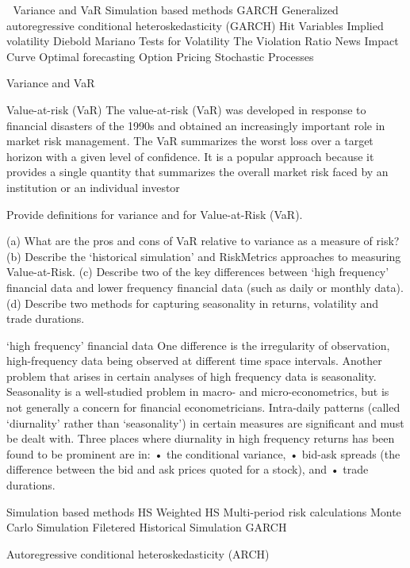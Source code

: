

Variance and VaR
Simulation based methods
GARCH
Generalized autoregressive conditional heteroskedasticity (GARCH)
Hit Variables
Implied volatility
Diebold Mariano Tests for Volatility
The Violation Ratio
News Impact Curve
Optimal forecasting
Option Pricing
Stochastic Processes



Variance and VaR

Value-at-risk (VaR)
The value-at-risk (VaR) was developed in response to ﬁnancial disasters of the 1990s and obtained an increasingly important role in market risk management.
The VaR summarizes the worst loss over a target horizon with a given level of conﬁdence. It is a popular approach because it provides a single quantity that summarizes the overall market risk faced by an institution or an individual investor

Provide deﬁnitions for variance and for Value-at-Risk (VaR).

(a) What are the pros and cons of VaR relative to variance as a measure of risk?
(b) Describe the ‘historical simulation’ and RiskMetrics approaches to measuring Value-at-Risk.
(c) Describe two of the key diﬀerences between ‘high frequency’ ﬁnancial data and lower frequency ﬁnancial data (such as daily or monthly data).
(d) Describe two methods for capturing seasonality in returns, volatility and trade durations.


‘high frequency’ ﬁnancial data 
One diﬀerence is the irregularity of observation, high-frequency data being observed at diﬀerent time space intervals. Another problem that arises in certain analyses of high frequency data is seasonality. 
Seasonality is a well-studied problem in macro- and micro-econometrics, but is not generally a concern for ﬁnancial econometricians. 
Intra-daily patterns (called ‘diurnality’ rather than ‘seasonality’) in certain measures are signiﬁcant and must be dealt with. 
Three places where diurnality in high frequency returns has been found to be prominent are in:
• the conditional variance,
• bid-ask spreads (the diﬀerence between the bid and ask prices quoted for a stock), and
• trade durations.



Simulation based methods
HS
Weighted HS
Multi-period risk calculations
Monte Carlo Simulation
Filetered Historical Simulation
GARCH 

Autoregressive conditional heteroskedasticity (ARCH)

